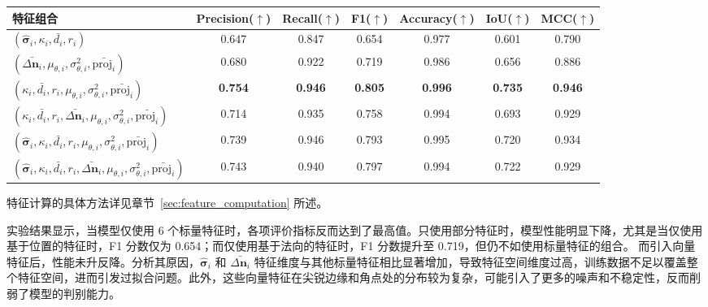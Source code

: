 \begin{table}[ht]
    \centering
    \small
    \setlength{\tabcolsep}{2.8pt}
    \label{tab:ablation_feature}
    \begin{threeparttable}
    \begin{tabular}{lcccccc}
            \toprule
            特征组合 & Precision($\uparrow$) & Recall($\uparrow$)  & F1($\uparrow$) & Accuracy($\uparrow$) & IoU($\uparrow$) & MCC($\uparrow$) \\
            \midrule
            $(\hat{\boldsymbol{\sigma}}_i, \kappa_i, \bar{d_i}, r_i)$ & 0.647 & 0.847 & 0.654 & 0.977 & 0.601 & 0.790 \\
            $(\bar{\Delta \mathbf{n}_i}, \mu_{\theta,i}, \sigma^2_{\theta,i}, \bar{\text{proj}_i})$ & 0.680 & 0.922 & 0.719 & 0.986 & 0.656 & 0.886 \\
            $(\kappa_i, \bar{d_i}, r_i, \mu_{\theta,i}, \sigma^2_{\theta,i}, \bar{\text{proj}_i})$ & \textbf{0.754} & \textbf{0.946} & \textbf{0.805} & \textbf{0.996} & \textbf{0.735} & \textbf{0.946} \\
            $(\kappa_i, \bar{d_i}, r_i, \bar{\Delta \mathbf{n}_i}, \mu_{\theta,i}, \sigma^2_{\theta,i}, \bar{\text{proj}_i})$ & 0.714 & 0.935 & 0.758 & 0.994 & 0.693 & 0.929 \\
            $(\hat{\boldsymbol{\sigma}}_i, \kappa_i, \bar{d_i}, r_i, \mu_{\theta,i}, \sigma^2_{\theta,i}, \bar{\text{proj}_i})$ & 0.739 & 0.946 & 0.793 & 0.995 & 0.720 & 0.934 \\
            $(\hat{\boldsymbol{\sigma}}_i, \kappa_i, \bar{d_i}, r_i, \bar{\Delta \mathbf{n}_i}, \mu_{\theta,i}, \sigma^2_{\theta,i}, \bar{\text{proj}_i})$ & 0.743 & 0.940 & 0.797 & 0.994 & 0.722 & 0.929 \\
            \bottomrule
        \end{tabular}
        \begin{tablenotes}
            \footnotesize
             \item 特征计算的具体方法详见章节~\ref{sec:feature_computation} 所述。
        \end{tablenotes}
        \end{threeparttable}
\end{table}

实验结果显示，当模型仅使用 6 个标量特征时，各项评价指标反而达到了最高值。只使用部分特征时，模型性能明显下降，尤其是当仅使用基于位置的特征时，F1 分数仅为 0.654；而仅使用基于法向的特征时，F1 分数提升至 0.719，但仍不如使用标量特征的组合。
而引入向量特征后，性能未升反降。分析其原因，$\hat{\boldsymbol{\sigma}}_i$ 和 $\bar{\Delta \mathbf{n}_i}$ 特征维度与其他标量特征相比显著增加，导致特征空间维度过高，训练数据不足以覆盖整个特征空间，进而引发过拟合问题。此外，这些向量特征在尖锐边缘和角点处的分布较为复杂，可能引入了更多的噪声和不稳定性，反而削弱了模型的判别能力。

